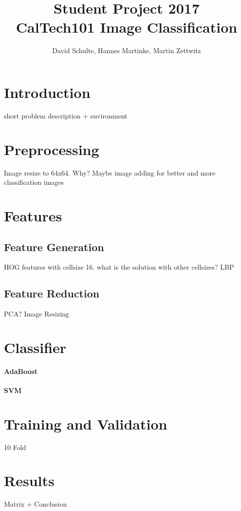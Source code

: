 \documentclass[a4paper,10pt]{article}
\title{ Student Project 2017 \\ CalTech101 Image Classification}
\author{David Schulte, Hannes Martinke, Martin Zettwitz}
\begin{document}
\maketitle

\section{Introduction}
 short problem description + environment

\section{Preprocessing}
Image resize to 64x64. Why?
Maybe image adding for better and more classification images

\section{Features}
\subsection{Feature Generation}
HOG features with cellsize 16. what is the solution with other cellsizes?
LBP

\subsection{Feature Reduction}
PCA? Image Resizing

\section{Classifier}
\paragraph{AdaBoost}
\paragraph{SVM}

\section{Training and Validation}
10 Fold

\section{Results}
Matrix + Conclusion 
\end{document}
